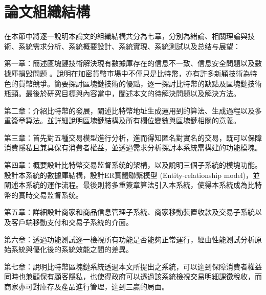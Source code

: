	\section{論文組織結構}
	在本節中將逐一說明本論文的組織結構共分為七章，分別為緒論、相關理論與技術、系統需求分析、系統概要設計、系統實現、系統測試以及总结与展望：

	第一章：簡述區塊鏈技術解決現有數據庫存在的信息不一致、信息安全問題以及數據庫損毀問題
	。說明在加密貨幣市場中不僅只是比特幣，亦有許多新穎技術為特色的貨幣競爭。簡要探討區塊鏈技術的優點，逐一探討比特幣的缺點及區塊鏈技術瓶頸。最後於研究目標與內容當中，闡述本文的待解決問題以及解決方法。

	第二章：介紹比特幣的發展，闡述比特幣地址生成運用到的算法、生成過程以及多重簽章算法。並詳細說明區塊鏈結構及所有欄位變數與區塊鏈相關的意義。

	第三章：首先對五種交易模型進行分析，進而得知匿名對實名的交易，既可以保障消費隱私且兼具保有消費者權益，並透過需求分析探討本系統需構建的功能模塊。

	第四章：概要設計比特幣交易监督系统的架構，以及說明三個子系統的模塊功能。設計本系統的數據庫結構，設計ER實體聯繫模型 (Entity-relationship model)，並闡述本系統的運作流程。最後則將多重簽章算法引入本系統，使得本系統成為比特幣的實時交易监督系统。

	第五章：詳細設計商家和商品信息管理子系統、商家移動裝置收款及交易子系統以及客戶端移動支付和交易子系統的介面。

	第六章：透過功能測試逐一檢視所有功能是否能夠正常運行，經由性能測試分析原始系統與優化後的系統效能之間的差異。

	第七章：說明比特幣區塊鏈系統透過本文所提出之系統，可以達到保障消費者權益同時也兼顧保有顧客隱私，也使得政府可以透過該系統檢視交易明細課徵稅收，而商家亦可對庫存及產品進行管理，達到三贏的局面。
